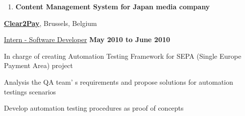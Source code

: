 \documentclass[10pt]{article}
\renewcommand\textit[1]{\underline{#1}}
\newcommand{\halfblankline}{\quad\vspace{-0.5\baselineskip}\pagebreak[3]}
\begin{document}
\begin{outerlist}
\begin{enumerate}
\begin{innerlist}
		\end{innerlist}

                \item \textbf{Content Management System for Japan media company}

            \end{enumerate}

\end{outerlist}

\halfblankline

\href{http://clear2pay.com/}{\textbf{Clear2Pay}}, Brussels, Belgium
\begin{outerlist}

\item[] \textit{Intern - Software Developer}%
        \hfill \textbf{May 2010 to June 2010}

	\begin{innerlist}

		\item In  charge  of    creating  Automation  Testing  Framework  for  SEPA  (Single  Europe  Payment Area)  project
		\item  Analysis  the  QA  team' s  requirements  and  propose  solutions  for  automation  testings scenarios
		\item  Develop  automation  testing  procedures  as  proof  of  concepts
	
	\end{innerlist}

\end{outerlist}

\halfblankline
\end{document}
